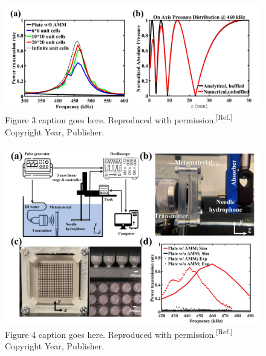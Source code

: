 \documentclass{WileyMSP-template}
\begin{document}
\begin{figure}
  \includegraphics[width=\linewidth]{Figure3.jpg}
  \caption{Figure 3 caption goes here. Reproduced with permission.\textsuperscript{[Ref.]} Copyright Year, Publisher.}
  \label{fig:boat1}
\end{figure}

\begin{figure}
  \includegraphics[width=\linewidth]{Figure4.jpg}
  \caption{Figure 4 caption goes here. Reproduced with permission.\textsuperscript{[Ref.]} Copyright Year, Publisher.}
  \label{fig:boat1}
\end{figure}
\end{document}
